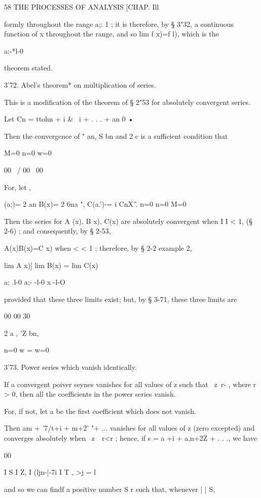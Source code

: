 58 THE PROCESSES OF ANALYSIS [CHAP. Ill 

formly throughout the range  a;:  1 ; it is therefore, by § 3"32, a continuous 
function of x throughout the range, and so lim f x)=f l), which is the 

a;-*l-0 

theorem stated. 

3'72. Abel's theorem* on multiplication of series. 

This is a modification of the theorem of § 2"53 for absolutely convergent 
series. 

Let Cn = ttohn +  i \& \ i + . . . + an  0 • 

Then the convergence of "  an, S bn and 2 c  is a sufficient condition that 

M=0 n=0 w=0 

 00 \ / 00 \ 00 

For, let , 

 (a;)= 2 an   B(x)= 2 6na ", C(a.')-= i CnX''. 
n=0 n=0 M=0 

Then the series for A (x), B x), C(x) are absolutely convergent when 
I   I < 1, (§ 2-6) ; and consequently, by § 2-53, 

A(x)B(x)=C x) 
when <  < 1 ; therefore, by § 2-2 example 2, 

  lim A x)]  lim B(x)  =   lim C(x)\ 

a; .l-0 a;- -l-0 x -l-O 

provided that these three limits exist; but, by § 3-71, these three limits are 

00 00 30 

2 a , 'Z bn, %

n=0 w = w=0 

3'73. Power series which vanish identically. 

If a convergent poiver seynes vanishes for all values of z such that \ z\  r- , 
where r  > 0, then all the coefficients in the power series vanish. 

For, if not, let a  be the first coefficient which does not vanish. 

Then am +  '7/t+i  +  m+2' "+ ... vanishes for all values of z (zero excepted) 
and converges absolutely when \ z\ \  r<r ; hence, if s = a +i + a,n+2Z + . . ., we 
have 

00 

I S I   Z, I (ljn-|-7i I T , 
>j = l 

and so we can findf a positive number S r such that, whenever |   |   S, 

